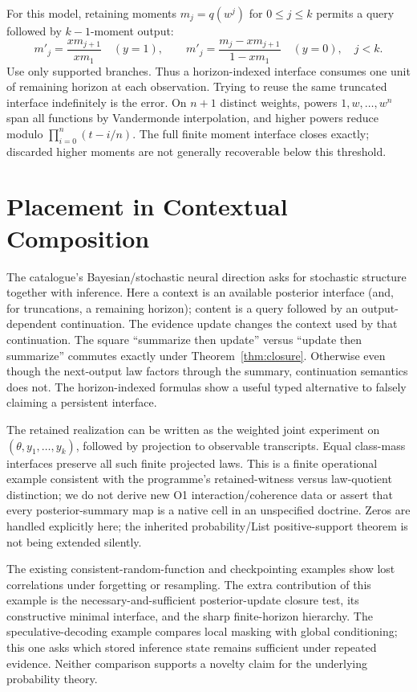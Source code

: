 \documentclass[11pt]{article}
\begin{document}
For this model, retaining moments $m_j=q(w^j)$ for $0\le j\le k$ permits a query followed by $k-1$-moment output:
\[m'_j=\frac{x m_{j+1}}{x m_1}\quad(y=1),\qquad
m'_j=\frac{m_j-xm_{j+1}}{1-xm_1}\quad(y=0),\quad j<k.\]
Use only supported branches. Thus a horizon-indexed interface consumes one unit of remaining horizon at each observation. Trying to reuse the same truncated interface indefinitely is the error. On $n+1$ distinct weights, powers $1,w,\ldots,w^n$ span all functions by Vandermonde interpolation, and higher powers reduce modulo $\prod_{i=0}^n(t-i/n)$. The full finite moment interface closes exactly; discarded higher moments are not generally recoverable below this threshold.

\section{Placement in Contextual Composition}
The catalogue's Bayesian/stochastic neural direction asks for stochastic structure together with inference. Here a context is an available posterior interface (and, for truncations, a remaining horizon); content is a query followed by an output-dependent continuation. The evidence update changes the context used by that continuation. The square ``summarize then update'' versus ``update then summarize'' commutes exactly under Theorem~\ref{thm:closure}. Otherwise even though the next-output law factors through the summary, continuation semantics does not. The horizon-indexed formulas show a useful typed alternative to falsely claiming a persistent interface.

The retained realization can be written as the weighted joint experiment on $(\theta,y_1,\ldots,y_k)$, followed by projection to observable transcripts. Equal class-mass interfaces preserve all such finite projected laws. This is a finite operational example consistent with the programme's retained-witness versus law-quotient distinction; we do not derive new O1 interaction/coherence data or assert that every posterior-summary map is a native cell in an unspecified doctrine. Zeros are handled explicitly here; the inherited probability/List positive-support theorem is not being extended silently.

The existing consistent-random-function and checkpointing examples show lost correlations under forgetting or resampling. The extra contribution of this example is the necessary-and-sufficient posterior-update closure test, its constructive minimal interface, and the sharp finite-horizon hierarchy. The speculative-decoding example compares local masking with global conditioning; this one asks which stored inference state remains sufficient under repeated evidence. Neither comparison supports a novelty claim for the underlying probability theory.
\end{document}
